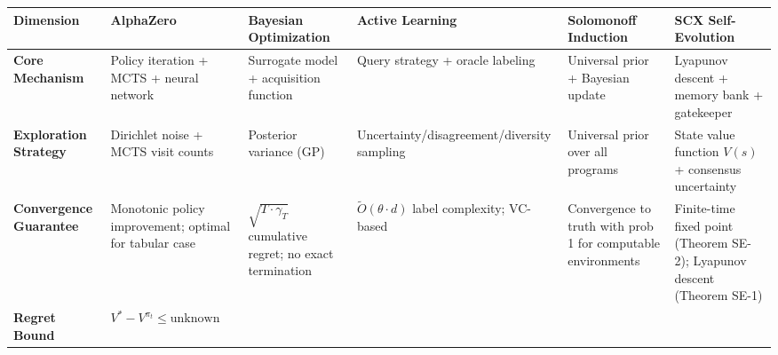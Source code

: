 \documentclass[
  12pt,
]{article}
\begin{document}
\begin{longtable}[]{@{}
  >{\raggedright\arraybackslash}p{}
  >{\raggedright\arraybackslash}p{}
  >{\raggedright\arraybackslash}p{}
  >{\raggedright\arraybackslash}p{}
  >{\raggedright\arraybackslash}p{}
  >{\raggedright\arraybackslash}p{}@{}}
\toprule\noalign{}
\begin{minipage}[b]{\linewidth}\raggedright
Dimension
\end{minipage} & \begin{minipage}[b]{\linewidth}\raggedright
AlphaZero
\end{minipage} & \begin{minipage}[b]{\linewidth}\raggedright
Bayesian Optimization
\end{minipage} & \begin{minipage}[b]{\linewidth}\raggedright
Active Learning
\end{minipage} & \begin{minipage}[b]{\linewidth}\raggedright
Solomonoff Induction
\end{minipage} & \begin{minipage}[b]{\linewidth}\raggedright
SCX Self-Evolution
\end{minipage} \\
\midrule\noalign{}
\endhead
\bottomrule\noalign{}
\endlastfoot
\textbf{Core Mechanism} & Policy iteration + MCTS + neural network &
Surrogate model + acquisition function & Query strategy + oracle
labeling & Universal prior + Bayesian update & Lyapunov descent + memory
bank + gatekeeper \\
\textbf{Exploration Strategy} & Dirichlet noise + MCTS visit counts &
Posterior variance (GP) & Uncertainty/disagreement/diversity sampling &
Universal prior over all programs & State value function \(V(s)\) +
consensus uncertainty \\
\textbf{Convergence Guarantee} & Monotonic policy improvement; optimal
for tabular case & \(\sqrt{T \cdot \gamma_T}\) cumulative regret; no
exact termination & \(\tilde{O}(\theta \cdot d)\) label complexity;
VC-based & Convergence to truth with prob 1 for computable environments
& Finite-time fixed point (Theorem SE-2); Lyapunov descent (Theorem
SE-1) \\
\textbf{Regret Bound} & \(V^* - V^{\pi_t} \leq \text{unknown}\)

\end{longtable}
\end{document}
